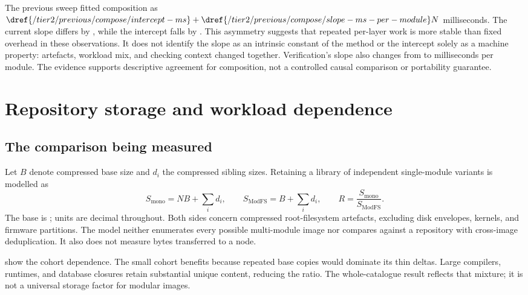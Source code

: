 The previous sweep fitted composition as $\dref{/tier2/previous/compose/intercept-ms}+\dref{/tier2/previous/compose/slope-ms-per-module}N$ milliseconds. The current slope differs by , while the intercept falls by . This asymmetry suggests that repeated per-layer work is more stable than fixed overhead in these observations. It does not identify the slope as an intrinsic constant of the method or the intercept solely as a machine property: artefacts, workload mix, and checking context changed together. Verification's slope also changes from  to  milliseconds per module. The evidence supports descriptive agreement for composition, not a controlled causal comparison or portability guarantee.

\section{Repository storage and workload dependence}

\subsection{The comparison being measured}

Let $B$ denote compressed base size and $d_i$ the compressed sibling sizes. Retaining a library of independent single-module variants is modelled as
\begin{equation}
S_{\mathrm{mono}}=NB+\sum_i d_i,\qquad
S_{\mathrm{ModFS}}=B+\sum_i d_i,\qquad
R=\frac{S_{\mathrm{mono}}}{S_{\mathrm{ModFS}}}.
\label{eq:storage}
\end{equation}
The base is ; units are decimal throughout. Both sides concern compressed root-filesystem artefacts, excluding disk envelopes, kernels, and firmware partitions. The model neither enumerates every possible multi-module image nor compares against a repository with cross-image deduplication. It also does not measure bytes transferred to a node.

 show the cohort dependence. The small cohort benefits because repeated base copies would dominate its thin deltas. Large compilers, runtimes, and database closures retain substantial unique content, reducing the ratio. The whole-catalogue result reflects that mixture; it is not a universal storage factor for modular images.

